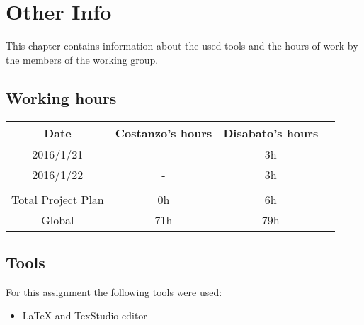 \documentclass[\mainpath/main]{subfiles}
\begin{document}
\chapter{Other Info}
\label{OtherInfo}

\setmyfancystyle

This chapter contains information about the used tools and the hours of work by the members of the working group.

\section{Working hours}
\begin{table}[h!]
	\centering
\begin{tabular}{cccc}
\hline
Date     	& Costanzo's hours & Disabato's hours  & \\ \hline
2016/1/21 	& -			  	   & 3h 			   & \\ \hline
2016/1/22 	& -			  	   & 3h 			   & \\ \hline

\\
Total Project Plan  & 0h 		 	   & 6h 			   & \\ \hline
Global 	    & 71h 		 	   & 79h 			   & \\ \hline

\end{tabular}
\end{table}

\section{Tools}
For this assignment the following tools were used:
\begin{itemize}
	\item \LaTeX{} and TexStudio editor
\end{itemize}
\end{document}
